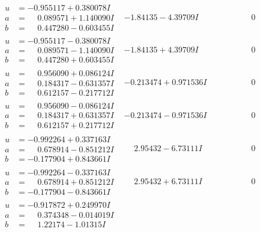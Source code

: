 \documentclass[1p]{elsarticle_modified}
\theoremstyle{definition}
\begin{document}
$$\begin{array}{c|c|c}
\begin{aligned}
u &= -0.955117 + 0.380078 I \\
a &= \phantom{-}0.089571 + 1.140090 I \\
b &= \phantom{-}0.447280 - 0.603455 I\end{aligned}
 & -1.84135 - 4.39709 I & \phantom{-0.000000 } 0 \\ \hline\begin{aligned}
u &= -0.955117 - 0.380078 I \\
a &= \phantom{-}0.089571 - 1.140090 I \\
b &= \phantom{-}0.447280 + 0.603455 I\end{aligned}
 & -1.84135 + 4.39709 I & \phantom{-0.000000 } 0 \\ \hline\begin{aligned}
u &= \phantom{-}0.956090 + 0.086124 I \\
a &= \phantom{-}0.184317 - 0.631357 I \\
b &= \phantom{-}0.612157 - 0.217712 I\end{aligned}
 & -0.213474 + 0.971536 I & \phantom{-0.000000 } 0 \\ \hline\begin{aligned}
u &= \phantom{-}0.956090 - 0.086124 I \\
a &= \phantom{-}0.184317 + 0.631357 I \\
b &= \phantom{-}0.612157 + 0.217712 I\end{aligned}
 & -0.213474 - 0.971536 I & \phantom{-0.000000 } 0 \\ \hline\begin{aligned}
u &= -0.992264 + 0.337163 I \\
a &= \phantom{-}0.678914 - 0.851212 I \\
b &= -0.177904 + 0.843661 I\end{aligned}
 & \phantom{-}2.95432 - 6.73111 I & \phantom{-0.000000 } 0 \\ \hline\begin{aligned}
u &= -0.992264 - 0.337163 I \\
a &= \phantom{-}0.678914 + 0.851212 I \\
b &= -0.177904 - 0.843661 I\end{aligned}
 & \phantom{-}2.95432 + 6.73111 I & \phantom{-0.000000 } 0 \\ \hline\begin{aligned}
u &= -0.917872 + 0.249970 I \\
a &= \phantom{-}0.374348 - 0.014019 I \\
b &= \phantom{-}1.22174 - 1.01315 I\end{aligned}

\end{array}$$
\end{document}
